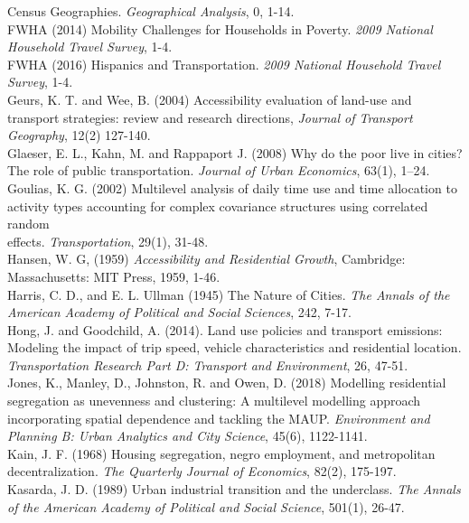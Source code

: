 \documentclass[a4paper,UKenglish]{lipics-v2018}
\begin{document}
\indent Census Geographies. \textit{Geographical Analysis}, 0, 1-14. \\
FWHA (2014) Mobility Challenges for Households in Poverty. \textit{2009 National Household  \indent Travel Survey}, 1-4. \\
FWHA (2016) Hispanics and Transportation. \textit{2009 National Household Travel Survey}, 1-4. \\
Geurs, K. T. and Wee, B. (2004) Accessibility evaluation of land-use and transport strategies: 
\indent review and research directions, \textit{Journal of Transport Geography}, 12(2) 127-140. \\
Glaeser, E. L., Kahn, M. and Rappaport J. (2008) Why do the poor live in cities? The role 
\indent of public transportation. \textit{Journal of Urban Economics}, 63(1), 1–24. \\
Goulias, K. G. (2002) Multilevel analysis of daily time use and time allocation to \\
\indent activity types accounting for complex covariance structures using correlated random \\
\indent effects. \textit{Transportation}, 29(1), 31-48. \\
Hansen, W. G, (1959) \textit{Accessibility and Residential Growth}, Cambridge: Massachusetts: 
\indent MIT Press, 1959, 1-46. \\
Harris, C. D., and E. L. Ullman (1945) The Nature of Cities. \textit{The Annals of the American 
\indent Academy of Political and Social Sciences}, 242, 7-17. \\
Hong, J. and Goodchild, A. (2014). Land use policies and transport emissions: Modeling 
\indent the impact of trip speed, vehicle characteristics and residential location. \textit{Transportation \indent Research Part D: Transport and Environment}, 26, 47-51. \\
Jones, K., Manley, D., Johnston, R. and Owen, D. (2018) Modelling residential segregation 
\indent as unevenness and clustering: A multilevel modelling approach incorporating spatial \indent dependence and tackling the MAUP. \textit{Environment and Planning B: Urban Analytics and 
\indent City Science}, 45(6), 1122-1141.\\
Kain, J. F. (1968) Housing segregation, negro employment, and metropolitan \\
\indent decentralization. \textit{The Quarterly Journal of Economics}, 82(2), 175-197. \\
Kasarda, J. D. (1989) Urban industrial transition and the underclass. \textit{The Annals of the
\indent American Academy of Political and Social Science}, 501(1), 26-47. \\
\end{document}

